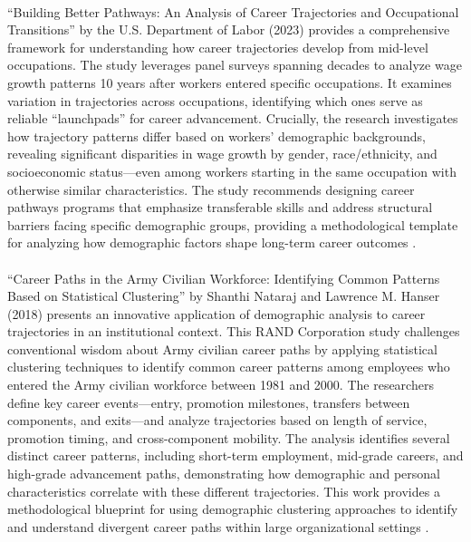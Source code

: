 \documentclass[../main.tex]{subfiles}
\begin{document}
\paragraph{} ``Building Better Pathways: An Analysis of Career Trajectories and Occupational Transitions'' by the U.S. Department of Labor (2023) provides a comprehensive framework for understanding how career trajectories develop from mid-level occupations. The study leverages panel surveys spanning decades to analyze wage growth patterns 10 years after workers entered specific occupations. It examines variation in trajectories across occupations, identifying which ones serve as reliable ``launchpads'' for career advancement. Crucially, the research investigates how trajectory patterns differ based on workers' demographic backgrounds, revealing significant disparities in wage growth by gender, race/ethnicity, and socioeconomic status—even among workers starting in the same occupation with otherwise similar characteristics. The study recommends designing career pathways programs that emphasize transferable skills and address structural barriers facing specific demographic groups, providing a methodological template for analyzing how demographic factors shape long-term career outcomes \citep{dol2023building}.

\paragraph{} ``Career Paths in the Army Civilian Workforce: Identifying Common Patterns Based on Statistical Clustering'' by Shanthi Nataraj and Lawrence M. Hanser (2018) presents an innovative application of demographic analysis to career trajectories in an institutional context. This RAND Corporation study challenges conventional wisdom about Army civilian career paths by applying statistical clustering techniques to identify common career patterns among employees who entered the Army civilian workforce between 1981 and 2000. The researchers define key career events—entry, promotion milestones, transfers between components, and exits—and analyze trajectories based on length of service, promotion timing, and cross-component mobility. The analysis identifies several distinct career patterns, including short-term employment, mid-grade careers, and high-grade advancement paths, demonstrating how demographic and personal characteristics correlate with these different trajectories. This work provides a methodological blueprint for using demographic clustering approaches to identify and understand divergent career paths within large organizational settings \citep{nataraj2018career}.
\end{document}
